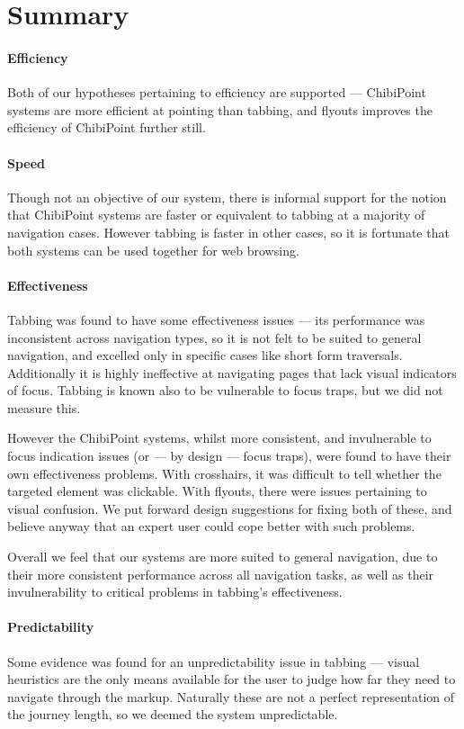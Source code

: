 \documentclass[11pt,openright,a4paper]{report}
\begin{document}
\section{Summary}
\paragraph{Efficiency}
Both of our hypotheses pertaining to efficiency are supported --- ChibiPoint systems are more efficient at pointing than tabbing, and flyouts improves the efficiency of ChibiPoint further still.

\paragraph{Speed}
Though not an objective of our system, there is informal support for the notion that ChibiPoint systems are faster or equivalent to tabbing at a majority of navigation cases. However tabbing is faster in other cases, so it is fortunate that both systems can be used together for web browsing.

\paragraph{Effectiveness}
Tabbing was found to have some effectiveness issues --- its performance was inconsistent across navigation types, so it is not felt to be suited to general navigation, and excelled only in specific cases like short form traversals. Additionally it is highly ineffective at navigating pages that lack visual indicators of focus. Tabbing is known also to be vulnerable to focus traps, but we did not measure this.

However the ChibiPoint systems, whilst more consistent, and invulnerable to focus indication issues (or --- by design --- focus traps), were found to have their own effectiveness problems. With crosshairs, it was difficult to tell whether the targeted element was clickable. With flyouts, there were issues pertaining to visual confusion. We put forward design suggestions for fixing both of these, and believe anyway that an expert user could cope better with such problems.

Overall we feel that our systems are more suited to general navigation, due to their more consistent performance across all navigation tasks, as well as their invulnerability to critical problems in tabbing's effectiveness.

\paragraph{Predictability}
Some evidence was found for an unpredictability issue in tabbing --- visual heuristics are the only means available for the user to judge how far they need to navigate through the markup. Naturally these are not a perfect representation of the journey length, so we deemed the system unpredictable.
\end{document}
